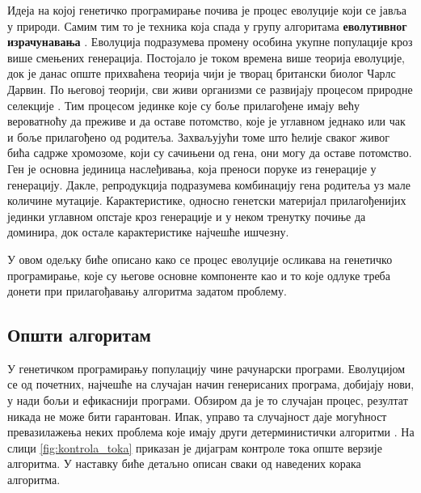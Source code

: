 \documentclass[a4paper]{article}
\begin{document}
Идеја на којој генетичко програмирање почива је процес еволуције који се јавља у природи. Самим тим то је техника која спада у групу алгоритама  \textbf{еволутивног израчунавања} \cite{compIntelligence}. Еволуција подразумева промену особина укупне популације кроз више смењених генерација. Постојало је током времена више теорија еволуције, док је данас опште прихваћена теорија чији је творац британски биолог Чарлс Дарвин. По његовој теорији, сви живи организми се развијају процесом природне селекције \cite{darwin1859}. Тим процесом јединке које су боље прилагођене имају већу вероватноћу да преживе и да оставе потомство, које је углавном једнако или чак и боље прилагођено од родитеља. Захваљујући томе што ћелије сваког живог бића садрже хромозоме, који су сачињени од гена, они могу да оставе потомство. Ген је основна јединица наслеђивања, која преноси поруке из генерације у генерацију. Дакле, репродукција подразумева комбинацију гена родитеља уз мале количине мутације. Карактеристике, односно генетски материјал прилагођенијих јединки углавном опстаје кроз генерације и у неком тренутку почиње да доминира, док остале карактеристике најчешће ишчезну.\newline

У овом одељку биће описано како се процес еволуције осликава на генетичко програмирање, које су његове основне компоненте као и то које одлуке треба донети при прилагођавању алгоритма задатом проблему.

\subsection{Општи алгоритам}

У генетичком програмирању популацију чине рачунарски програми. Еволуцијом се од почетних, најчешће на случајан начин генерисаних програма, добијају нови, у нади бољи и ефикаснији програми. Обзиром да је то случајан процес, резултат никада не може бити гарантован. Ипак, управо та случајност даје могућност превазилажења неких проблема које имају други детерминистички алгоритми \cite{fieldGuidetoGP}. На слици \ref{fig:kontrola_toka} приказан је дијаграм контроле тока опште верзије алгоритма. У наставку биће детаљно описан сваки од наведених корака алгоритма.
\end{document}

